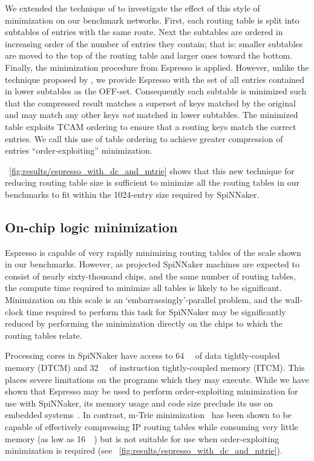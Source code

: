 \documentclass[conference]{IEEEtran}
\begin{document}
We extended the technique of \textcite{Liu2002} to investigate the effect of this style of minimization on our benchmark networks.
First, each routing table is split into subtables of entries with the same route.
Next the subtables are ordered in increasing order of the number of entries they contain; that is: smaller subtables are moved to the top of the routing table and larger ones toward the bottom.
Finally, the minimization procedure from Espresso is applied.
However, unlike the technique proposed by \textcite{Liu2002}, we provide Espresso with the set of all entries contained in lower subtables as the OFF-set.
Consequently each subtable is minimized such that the compressed result matches a superset of keys matched by the original and may match any other keys \textit{not} matched in lower subtables.
The minimized table exploits TCAM ordering to ensure that a routing keys match the correct entries.
We call this use of table ordering to achieve greater compression of entries ``order-exploiting'' minimization.

\figurename~\ref{fig:results/espresso_with_dc_and_mtrie} shows that this new technique for reducing routing table size is sufficient to minimize all the routing tables in our benchmarks to fit within the 1024-entry size required by SpiNNaker.

\subsection*{On-chip logic minimization}

Espresso is capable of very rapidly minimizing routing tables of the scale shown in our benchmarks.
However, as projected SpiNNaker machines are expected to consist of nearly sixty-thousand chips, and the same number of routing tables, the  compute time required to minimize all tables is likely to be significant.
Minimization on this scale is an `embarrassingly'-parallel problem, and the wall-clock time required to perform this task for SpiNNaker may be significantly reduced by performing the minimization directly on the chips to which the routing tables relate.

Processing cores in SpiNNaker have access to \SI{64}{\kibi\byte} of data tightly-coupled memory (DTCM) and \SI{32}{\kibi\byte} of instruction tightly-coupled memory (ITCM).
This places severe limitations on the programs which they may execute.
While we have shown that Espresso may be used to perform order-exploiting minimization for use with SpiNNaker, its memory usage and code size preclude its use on embedded systems~\parencite{Lysecky2003}.
In contrast, m-Trie minimization~\parencite{Ahmad2007} has been shown to be capable of effectively compressing IP routing tables while consuming very little memory (as low as \SI{16}{\kibi\byte}) but is not suitable for use when order-exploiting minimization is required (see \figurename~\ref{fig:results/espresso_with_dc_and_mtrie}).
\end{document}
